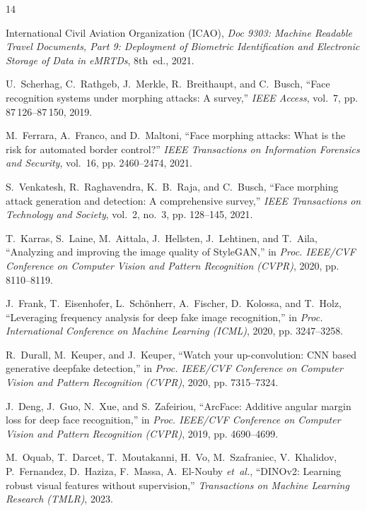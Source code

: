 \documentclass[11pt,a4paper]{article}
\begin{document}
\begingroup
\small
\begin{thebibliography}{14}

International Civil Aviation Organization (ICAO), \emph{Doc 9303: Machine Readable Travel Documents, Part 9: Deployment of Biometric Identification and Electronic Storage of Data in eMRTDs}, 8th~ed., 2021.

U.~Scherhag, C.~Rathgeb, J.~Merkle, R.~Breithaupt, and C.~Busch, ``Face recognition systems under morphing attacks: A survey,'' \emph{IEEE Access}, vol.~7, pp. 87\,126--87\,150, 2019.

M.~Ferrara, A.~Franco, and D.~Maltoni, ``Face morphing attacks: What is the risk for automated border control?'' \emph{IEEE Transactions on Information Forensics and Security}, vol.~16, pp. 2460--2474, 2021.

S.~Venkatesh, R.~Raghavendra, K.~B.~Raja, and C.~Busch, ``Face morphing attack generation and detection: A comprehensive survey,'' \emph{IEEE Transactions on Technology and Society}, vol.~2, no.~3, pp. 128--145, 2021.

T.~Karras, S.~Laine, M.~Aittala, J.~Hellsten, J.~Lehtinen, and T.~Aila, ``Analyzing and improving the image quality of StyleGAN,'' in \emph{Proc. IEEE/CVF Conference on Computer Vision and Pattern Recognition (CVPR)}, 2020, pp. 8110--8119.

J.~Frank, T.~Eisenhofer, L.~Sch{\"o}nherr, A.~Fischer, D.~Kolossa, and T.~Holz, ``Leveraging frequency analysis for deep fake image recognition,'' in \emph{Proc. International Conference on Machine Learning (ICML)}, 2020, pp. 3247--3258.

R.~Durall, M.~Keuper, and J.~Keuper, ``Watch your up-convolution: CNN based generative deepfake detection,'' in \emph{Proc. IEEE/CVF Conference on Computer Vision and Pattern Recognition (CVPR)}, 2020, pp. 7315--7324.

J.~Deng, J.~Guo, N.~Xue, and S.~Zafeiriou, ``ArcFace: Additive angular margin loss for deep face recognition,'' in \emph{Proc. IEEE/CVF Conference on Computer Vision and Pattern Recognition (CVPR)}, 2019, pp. 4690--4699.

M.~Oquab, T.~Darcet, T.~Moutakanni, H.~Vo, M.~Szafraniec, V.~Khalidov, P.~Fernandez, D.~Haziza, F.~Massa, A.~El-Nouby \emph{et~al.}, ``DINOv2: Learning robust visual features without supervision,'' \emph{Transactions on Machine Learning Research (TMLR)}, 2023.


\end{thebibliography}
\end{document}
